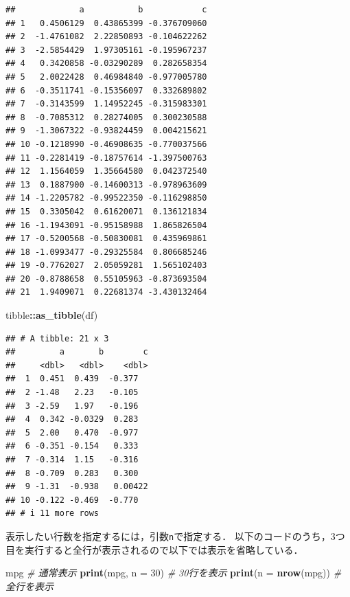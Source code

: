 \documentclass[
]{article}
\newenvironment{Shaded}{\begin{snugshade}}{\end{snugshade}}
\newcommand{\AttributeTok}[1]{\textcolor[rgb]{0.13,0.29,0.53}{#1}}
\newcommand{\CommentTok}[1]{\textcolor[rgb]{0.56,0.35,0.01}{\textit{#1}}}
\newcommand{\DecValTok}[1]{\textcolor[rgb]{0.00,0.00,0.81}{#1}}
\newcommand{\FunctionTok}[1]{\textcolor[rgb]{0.13,0.29,0.53}{\textbf{#1}}}
\newcommand{\NormalTok}[1]{#1}
\newcommand{\SpecialCharTok}[1]{\textcolor[rgb]{0.81,0.36,0.00}{\textbf{#1}}}
\begin{document}
\begin{verbatim}
##             a           b            c
## 1   0.4506129  0.43865399 -0.376709060
## 2  -1.4761082  2.22850893 -0.104622262
## 3  -2.5854429  1.97305161 -0.195967237
## 4   0.3420858 -0.03290289  0.282658354
## 5   2.0022428  0.46984840 -0.977005780
## 6  -0.3511741 -0.15356097  0.332689802
## 7  -0.3143599  1.14952245 -0.315983301
## 8  -0.7085312  0.28274005  0.300230588
## 9  -1.3067322 -0.93824459  0.004215621
## 10 -0.1218990 -0.46908635 -0.770037566
## 11 -0.2281419 -0.18757614 -1.397500763
## 12  1.1564059  1.35664580  0.042372540
## 13  0.1887900 -0.14600313 -0.978963609
## 14 -1.2205782 -0.99522350 -0.116298850
## 15  0.3305042  0.61620071  0.136121834
## 16 -1.1943091 -0.95158988  1.865826504
## 17 -0.5200568 -0.50830081  0.435969861
## 18 -1.0993477 -0.29325584  0.806685246
## 19 -0.7762027  2.05059281  1.565102403
## 20 -0.8788658  0.55105963 -0.873693504
## 21  1.9409071  0.22681374 -3.430132464
\end{verbatim}

\begin{Shaded}
\begin{Highlighting}[]
\NormalTok{tibble}\SpecialCharTok{::}\FunctionTok{as\_tibble}\NormalTok{(df)}
\end{Highlighting}
\end{Shaded}

\begin{verbatim}
## # A tibble: 21 x 3
##         a       b        c
##     <dbl>   <dbl>    <dbl>
##  1  0.451  0.439  -0.377  
##  2 -1.48   2.23   -0.105  
##  3 -2.59   1.97   -0.196  
##  4  0.342 -0.0329  0.283  
##  5  2.00   0.470  -0.977  
##  6 -0.351 -0.154   0.333  
##  7 -0.314  1.15   -0.316  
##  8 -0.709  0.283   0.300  
##  9 -1.31  -0.938   0.00422
## 10 -0.122 -0.469  -0.770  
## # i 11 more rows
\end{verbatim}

表示したい行数を指定するには，引数\texttt{n}で指定する．
以下のコードのうち，3つ目を実行すると全行が表示されるので以下では表示を省略している．

\begin{Shaded}
\begin{Highlighting}[]
\NormalTok{mpg                  }\CommentTok{\# 通常表示}
\FunctionTok{print}\NormalTok{(mpg, }\AttributeTok{n =} \DecValTok{30}\NormalTok{)   }\CommentTok{\# 30行を表示}
\FunctionTok{print}\NormalTok{(}\AttributeTok{n =} \FunctionTok{nrow}\NormalTok{(mpg)) }\CommentTok{\# 全行を表示}
\end{Highlighting}
\end{Shaded}
\end{document}
